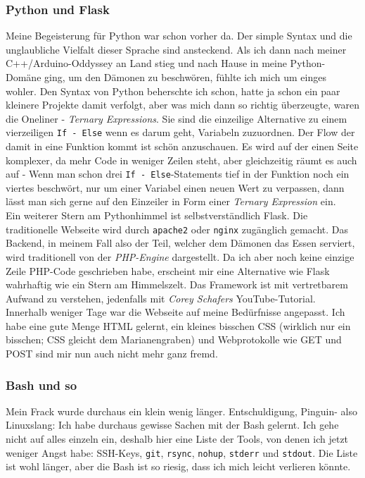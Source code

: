 \documentclass[12pt,titlepage,a4paper]{article}
\begin{document}
\subsubsection{Python und Flask}
Meine Begeisterung für Python war schon vorher da. Der simple Syntax und die unglaubliche Vielfalt dieser Sprache sind ansteckend. Als ich dann nach meiner C++/Arduino-Oddyssey an Land stieg und nach Hause in meine Python-Domäne ging, um den Dämonen zu beschwören, fühlte ich mich um einges wohler. Den Syntax von Python beherschte ich schon, hatte ja schon ein paar kleinere Projekte damit verfolgt, aber was mich dann so richtig überzeugte, waren die Oneliner - \textit{Ternary Expressions}. Sie sind die einzeilige Alternative zu einem vierzeiligen \verb&If - Else& wenn es darum geht, Variabeln zuzuordnen. Der Flow der damit in eine Funktion kommt ist schön anzuschauen. Es wird auf der einen Seite komplexer, da mehr Code in weniger Zeilen steht, aber gleichzeitig räumt es auch auf - Wenn man schon drei \verb&If - Else&-Statements tief in der Funktion noch ein viertes beschwört, nur um einer Variabel einen neuen Wert zu verpassen, dann lässt man sich gerne auf den Einzeiler in Form einer \textit{Ternary Expression} ein.\\Ein weiterer Stern am Pythonhimmel ist selbstverständlich Flask. Die traditionelle Webseite wird durch \verb&apache2& oder \verb&nginx& zugänglich gemacht. Das Backend, in meinem Fall also der Teil, welcher dem Dämonen das Essen serviert, wird traditionell von der \textit{PHP-Engine} dargestellt. Da ich aber noch keine einzige Zeile PHP-Code geschrieben habe, erscheint mir eine Alternative wie Flask wahrhaftig wie ein Stern am Himmelszelt. Das Framework ist mit vertretbarem Aufwand zu verstehen, jedenfalls mit \textit{Corey Schafers} YouTube-Tutorial. Innerhalb weniger Tage war die Webseite auf meine Bedürfnisse angepasst. Ich habe eine gute Menge HTML gelernt, ein kleines bisschen CSS (wirklich nur ein bisschen; CSS gleicht dem Marianengraben) und Webprotokolle wie GET und POST sind mir nun auch nicht mehr ganz fremd.

\subsubsection{Bash und so}
Mein Frack wurde durchaus ein klein wenig länger. Entschuldigung, Pinguin- also Linuxslang: Ich habe durchaus gewisse Sachen mit der Bash gelernt. Ich gehe nicht auf alles einzeln ein, deshalb hier eine Liste der Tools, von denen ich jetzt weniger Angst habe: SSH-Keys, \verb&git&, \verb&rsync&, \verb&nohup&, \verb&stderr& und \verb&stdout&. Die Liste ist wohl länger, aber die Bash ist so riesig, dass ich mich leicht verlieren könnte.
\end{document}
